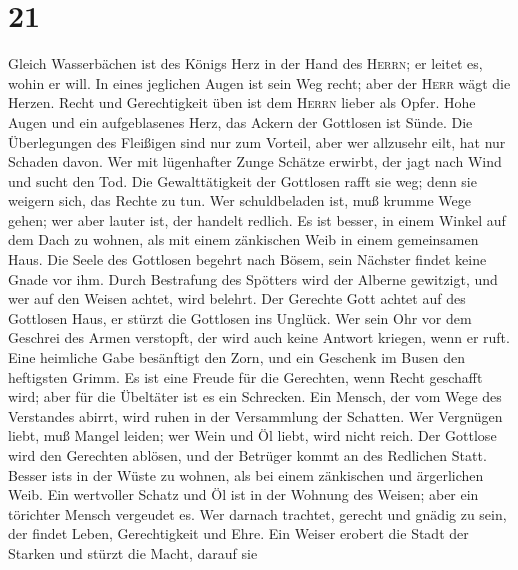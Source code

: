 \hypertarget{section-20}{%
\section{21}\label{section-20}}

 Gleich Wasserbächen ist des Königs Herz in der Hand des
\textsc{Herrn}; er leitet es, wohin er will.  In eines
jeglichen Augen ist sein Weg recht; aber der \textsc{Herr} wägt die
Herzen.  Recht und Gerechtigkeit üben ist dem
\textsc{Herrn} lieber als Opfer.  Hohe Augen und ein
aufgeblasenes Herz, das Ackern der Gottlosen ist Sünde. 
Die Überlegungen des Fleißigen sind nur zum Vorteil, aber wer allzusehr
eilt, hat nur Schaden davon.  Wer mit lügenhafter Zunge
Schätze erwirbt, der jagt nach Wind und sucht den Tod. 
Die Gewalttätigkeit der Gottlosen rafft sie weg; denn sie weigern sich,
das Rechte zu tun.  Wer schuldbeladen ist, muß krumme Wege
gehen; wer aber lauter ist, der handelt redlich.  Es ist
besser, in einem Winkel auf dem Dach zu wohnen, als mit einem zänkischen
Weib in einem gemeinsamen Haus.  Die Seele des Gottlosen
begehrt nach Bösem, sein Nächster findet keine Gnade vor ihm.
 Durch Bestrafung des Spötters wird der Alberne
gewitzigt, und wer auf den Weisen achtet, wird belehrt. 
Der Gerechte Gott achtet auf des Gottlosen Haus, er stürzt die Gottlosen
ins Unglück.  Wer sein Ohr vor dem Geschrei des Armen
verstopft, der wird auch keine Antwort kriegen, wenn er ruft.
 Eine heimliche Gabe besänftigt den Zorn, und ein
Geschenk im Busen den heftigsten Grimm.  Es ist eine
Freude für die Gerechten, wenn Recht geschafft wird; aber für die
Übeltäter ist es ein Schrecken.  Ein Mensch, der vom Wege
des Verstandes abirrt, wird ruhen in der Versammlung der Schatten.
 Wer Vergnügen liebt, muß Mangel leiden; wer Wein und Öl
liebt, wird nicht reich.  Der Gottlose wird den Gerechten
ablösen, und der Betrüger kommt an des Redlichen Statt. 
Besser ist\textquotesingle s in der Wüste zu wohnen, als bei einem
zänkischen und ärgerlichen Weib.  Ein wertvoller Schatz
und Öl ist in der Wohnung des Weisen; aber ein törichter Mensch
vergeudet es.  Wer darnach trachtet, gerecht und gnädig
zu sein, der findet Leben, Gerechtigkeit und Ehre.  Ein
Weiser erobert die Stadt der Starken und stürzt die Macht, darauf sie
